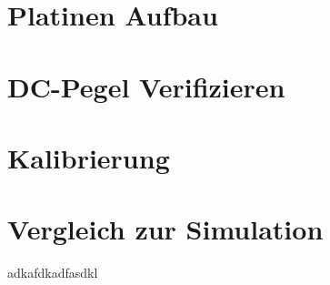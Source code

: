 
\section{Platinen Aufbau}
\section{DC-Pegel Verifizieren}
\section{Kalibrierung}
\section{Vergleich zur Simulation}
\clearpagefsjgjfg
adkafdkadfasdkl